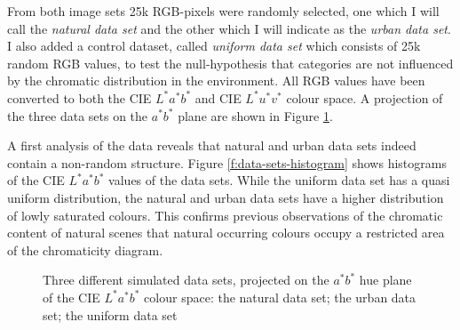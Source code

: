 From both image sets 25k RGB-pixels were randomly selected, one which
I will call the \emph{natural data set} and the other which I will
indicate as the \emph{urban data set}. I also added a control dataset,
called \emph{uniform data set} which consists of 25k random RGB
values, to test the null-hypothesis that categories are not influenced
by the chromatic distribution in the environment. All RGB values have
been converted to both the CIE $L^*a^*b^*$ and CIE $L^*u^*v^*$ colour
space. A projection of the three data sets on the $a^*b^*$ plane are
shown in Figure \ref{f:simulated-data-sets}.

A first analysis of the data reveals that natural and urban data sets
indeed contain a non-random structure. Figure
\ref{f:data-sets-histogram} shows histograms of the CIE $L^*a^*b^*$
values of the data sets. While the uniform data set has a quasi
uniform distribution, the natural and urban data sets have a higher
distribution of lowly saturated colours. This confirms previous
observations of the chromatic content of natural scenes
\citep{howard94colors} that natural occurring
colours occupy a restricted area of the chromaticity diagram.

\begin{figure}[htbp]
\centering
{}
\caption[Three different simulated data sets]{Three different
  simulated data sets, projected on the $a^*b^*$ hue plane of the CIE
  $L^*a^*b^*$ colour space:  the natural
  data set;  the urban data set;
   the uniform data set}
\label{f:simulated-data-sets}
\end{figure}

